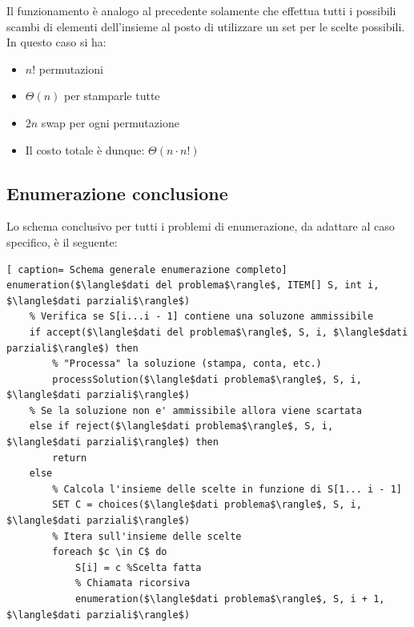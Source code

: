 \documentclass[../cheatSheetAlgoritmi.tex]{subfiles}
\begin{document}
Il funzionamento è analogo al precedente solamente che effettua tutti i possibili scambi di elementi dell'insieme al posto di utilizzare un set per le scelte possibili. \\
In questo caso si ha:
\begin{itemize}
	\item $n!$ permutazioni
	\item $\Theta(n)$ per stamparle tutte
	\item $2n$ swap per ogni permutazione
	\item Il costo totale è dunque: $\Theta(n \cdot n!)$
\end{itemize}
\subsection{Enumerazione conclusione}
Lo schema conclusivo per tutti i problemi di enumerazione, da adattare al caso specifico, è il seguente:
 \begin{lstlisting}[ caption= Schema generale enumerazione completo]
enumeration($\langle$dati del problema$\rangle$, ITEM[] S, int i, $\langle$dati parziali$\rangle$)
	% Verifica se S[i...i - 1] contiene una soluzone ammissibile
	if accept($\langle$dati del problema$\rangle$, S, i, $\langle$dati parziali$\rangle$) then
		% "Processa" la soluzione (stampa, conta, etc.)
		processSolution($\langle$dati problema$\rangle$, S, i, $\langle$dati parziali$\rangle$)
	% Se la soluzione non e' ammissibile allora viene scartata
	else if reject($\langle$dati problema$\rangle$, S, i, $\langle$dati parziali$\rangle$) then
		return
	else
		% Calcola l'insieme delle scelte in funzione di S[1... i - 1]
		SET C = choices($\langle$dati problema$\rangle$, S, i, $\langle$dati parziali$\rangle$)
		% Itera sull'insieme delle scelte
		foreach $c \in C$ do
			S[i] = c %Scelta fatta
			% Chiamata ricorsiva
			enumeration($\langle$dati problema$\rangle$, S, i + 1, $\langle$dati parziali$\rangle$)
\end{lstlisting}
\end{document}
